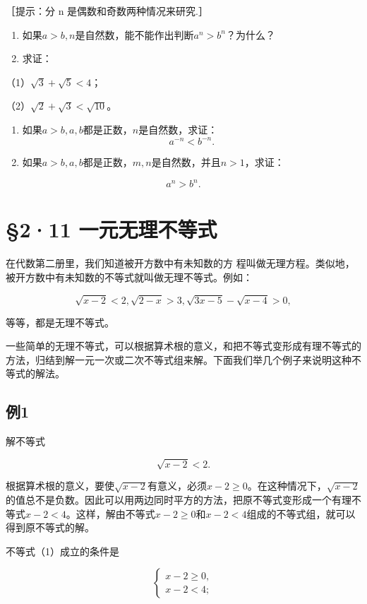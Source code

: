 ［提示：分 n 是偶数和奇数两种情况来研究.］

\begin{enumerate}[start=2]
\item
  如果\(a > b, n\)是自然数，能不能作出判断\(a^n > b^n\)？为什么？
\item
  求证：
\end{enumerate}

（1）\(\sqrt{3} + \sqrt{5} < 4\)；

（2）\(\sqrt{2} + \sqrt{3} < \sqrt{10}\)。

\begin{enumerate}[start=4]
\item
  如果\(a > b, a, b\)都是正数，\(n\)是自然数，求证：
\[
a^{- n} < b^{- n}.
\]
\item
  如果\(a > b, a, b\)都是正数，\(m, n\)是自然数，并且\(n > 1\)，求证：
\end{enumerate}

\[
a^{n} > b^{n}.
\]

\section{§2·11 一元无理不等式}

在代数第二册里，我们知道被开方数中有未知数的方
程叫做无理方程。类似地，被开方数中有未知数的不等式就叫做无理不等式。例如：

\[
\sqrt{x - 2} < 2, \sqrt{2 - x} > 3, \sqrt{3 x - 5} - \sqrt{x - 4} > 0,
\]

等等，都是无理不等式。

一些简单的无理不等式，可以根据算术根的意义，和把不等式变形成有理不等式的方法，归结到解一元一次或二次不等式组来解。下面我们举几个例子来说明这种不等式的解法。

\subsection{例1}

解不等式

\[
\sqrt{x - 2} < 2. \tag {1}
\]

根据算术根的意义，要使\(\sqrt{x - 2}\)有意义，必须\(x - 2 \geqslant 0\)。在这种情况下，\(\sqrt{x - 2}\)的值总不是负数。因此可以用两边同时平方的方法，把原不等式变形成一个有理不等式\(x - 2 < 4\)。这样，解由不等式\(x - 2 \geqslant 0\)和\(x - 2 < 4\)组成的不等式组，就可以得到原不等式的解。

 不等式（1）成立的条件是

\[
\left\{ \begin{array}{l} x - 2 \geqslant 0, \\ x - 2 < 4; \end{array} \right.
\]

